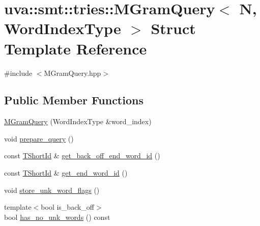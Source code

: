 \hypertarget{structuva_1_1smt_1_1tries_1_1_m_gram_query}{}\section{uva\+:\+:smt\+:\+:tries\+:\+:M\+Gram\+Query$<$ N, Word\+Index\+Type $>$ Struct Template Reference}
\label{structuva_1_1smt_1_1tries_1_1_m_gram_query}


{\ttfamily \#include $<$M\+Gram\+Query.\+hpp$>$}

\subsection*{Public Member Functions}
\begin{DoxyCompactItemize}
\item 
\hyperlink{structuva_1_1smt_1_1tries_1_1_m_gram_query_afe6a6be3b97a705ac5c1c8eb57cac96a}{M\+Gram\+Query} (Word\+Index\+Type \&word\+\_\+index)
\item 
void \hyperlink{structuva_1_1smt_1_1tries_1_1_m_gram_query_add8dd5d539966c5bbfc41fa7346f2260}{prepare\+\_\+query} ()
\item 
const \hyperlink{namespaceuva_1_1smt_1_1hashing_adcf22e1982ad09d3a63494c006267469}{T\+Short\+Id} \& \hyperlink{structuva_1_1smt_1_1tries_1_1_m_gram_query_ab0777570953f2e6654c4def460175026}{get\+\_\+back\+\_\+off\+\_\+end\+\_\+word\+\_\+id} ()
\item 
const \hyperlink{namespaceuva_1_1smt_1_1hashing_adcf22e1982ad09d3a63494c006267469}{T\+Short\+Id} \& \hyperlink{structuva_1_1smt_1_1tries_1_1_m_gram_query_ad1203d0eadc26f9601280e703304a559}{get\+\_\+end\+\_\+word\+\_\+id} ()
\item 
void \hyperlink{structuva_1_1smt_1_1tries_1_1_m_gram_query_a438b841d34fa3600fcc6543c4bb46fd2}{store\+\_\+unk\+\_\+word\+\_\+flags} ()
\item 
{\footnotesize template$<$bool is\+\_\+back\+\_\+off$>$ }\\bool \hyperlink{structuva_1_1smt_1_1tries_1_1_m_gram_query_a6237256140b76150a4844aede65a3b77}{has\+\_\+no\+\_\+unk\+\_\+words} () const 
\end{DoxyCompactItemize}
